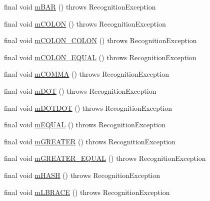 \begin{DoxyCompactItemize}
final void \hyperlink{classorg_1_1tzi_1_1use_1_1parser_1_1ocl_1_1_o_c_l_lexer_a1076ca982e3bad31696c45252bbc7b20}{m\-B\-A\-R} ()  throws Recognition\-Exception 
\item 
final void \hyperlink{classorg_1_1tzi_1_1use_1_1parser_1_1ocl_1_1_o_c_l_lexer_ade80bf67a2e2e87040190772f586314d}{m\-C\-O\-L\-O\-N} ()  throws Recognition\-Exception 
\item 
final void \hyperlink{classorg_1_1tzi_1_1use_1_1parser_1_1ocl_1_1_o_c_l_lexer_abc346deb533d24f735ec69327c89b20d}{m\-C\-O\-L\-O\-N\-\_\-\-C\-O\-L\-O\-N} ()  throws Recognition\-Exception 
\item 
final void \hyperlink{classorg_1_1tzi_1_1use_1_1parser_1_1ocl_1_1_o_c_l_lexer_af1b84a538c66ef11b6959ee55f3f911d}{m\-C\-O\-L\-O\-N\-\_\-\-E\-Q\-U\-A\-L} ()  throws Recognition\-Exception 
\item 
final void \hyperlink{classorg_1_1tzi_1_1use_1_1parser_1_1ocl_1_1_o_c_l_lexer_ac3d81cae5868b6a8deb32dfe7738e73d}{m\-C\-O\-M\-M\-A} ()  throws Recognition\-Exception 
\item 
final void \hyperlink{classorg_1_1tzi_1_1use_1_1parser_1_1ocl_1_1_o_c_l_lexer_aa777cab4e220eef0b6139ba026c8b2af}{m\-D\-O\-T} ()  throws Recognition\-Exception 
\item 
final void \hyperlink{classorg_1_1tzi_1_1use_1_1parser_1_1ocl_1_1_o_c_l_lexer_a301f65a2327a0b11e2736c9825719bbf}{m\-D\-O\-T\-D\-O\-T} ()  throws Recognition\-Exception 
\item 
final void \hyperlink{classorg_1_1tzi_1_1use_1_1parser_1_1ocl_1_1_o_c_l_lexer_ad951806353b93b36f082ee5c0a3f2ed4}{m\-E\-Q\-U\-A\-L} ()  throws Recognition\-Exception 
\item 
final void \hyperlink{classorg_1_1tzi_1_1use_1_1parser_1_1ocl_1_1_o_c_l_lexer_a2290362907f7523bc4ea0c3dad60dd14}{m\-G\-R\-E\-A\-T\-E\-R} ()  throws Recognition\-Exception 
\item 
final void \hyperlink{classorg_1_1tzi_1_1use_1_1parser_1_1ocl_1_1_o_c_l_lexer_a711e7c2e30369dd983a66ecb0d649c46}{m\-G\-R\-E\-A\-T\-E\-R\-\_\-\-E\-Q\-U\-A\-L} ()  throws Recognition\-Exception 
\item 
final void \hyperlink{classorg_1_1tzi_1_1use_1_1parser_1_1ocl_1_1_o_c_l_lexer_a443585ead999cba7ff86b7be7bf39522}{m\-H\-A\-S\-H} ()  throws Recognition\-Exception 
\item 
final void \hyperlink{classorg_1_1tzi_1_1use_1_1parser_1_1ocl_1_1_o_c_l_lexer_a43700c4992d449e225ce2e43ac6fc0a5}{m\-L\-B\-R\-A\-C\-E} ()  throws Recognition\-Exception 
\item 

\end{DoxyCompactItemize}
